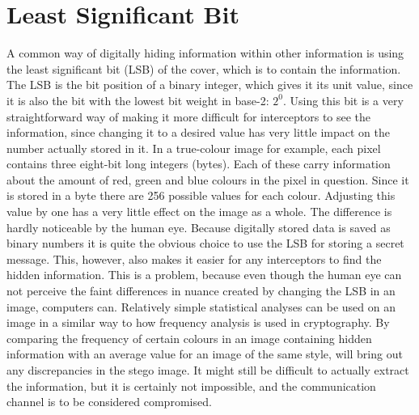 \section{Least Significant Bit}
A common way of digitally hiding information within other information is using the least significant bit (LSB) of the cover, which is to contain the information. 
The LSB is the bit position of a binary integer, which gives it its unit value, since it is also the bit with the lowest bit weight in base-2: $2^0$.
Using this bit is a very straightforward way of making it more difficult for interceptors to see the information, since changing it to a desired value has very little impact on the number actually stored in it.
In a true-colour image for example, each pixel contains three eight-bit long integers (bytes). Each of these carry information about the amount of red, green and blue colours in the pixel in question.
Since it is stored in a byte there are 256 possible values for each colour. Adjusting this value by one has a very little effect on the image as a whole. The difference is hardly noticeable by the human eye.
Because digitally stored data is saved as binary numbers it is quite the obvious choice to use the LSB for storing a secret message. This, however, also makes it easier for any interceptors to find the hidden information.
This is a problem, because even though the human eye can not perceive the  faint differences in nuance created by changing the LSB in an image, computers can. 
Relatively simple statistical analyses can be used on an image in a similar way to how frequency analysis is used in cryptography. 
By comparing the frequency of certain colours in an image containing hidden information with an average value for an image of the same style, will bring out any discrepancies in the stego image. 
It might still be difficult to actually extract the information, but it is certainly not impossible, and the communication channel is to be considered compromised.